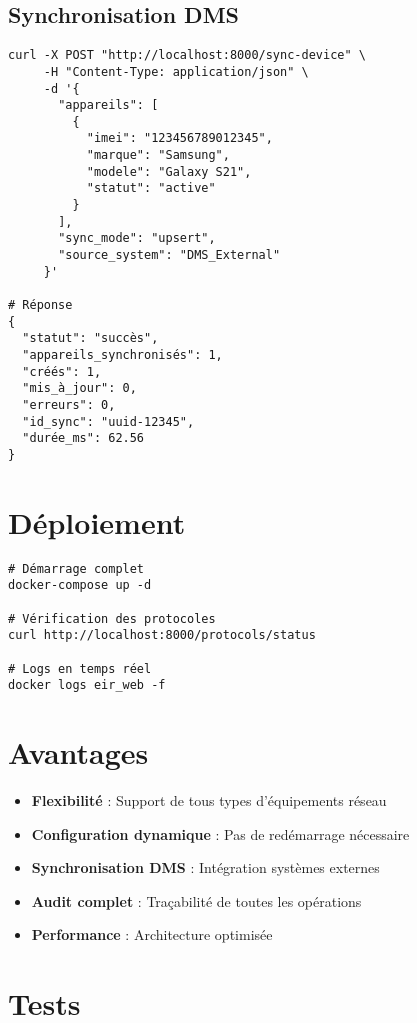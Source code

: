 \documentclass[11pt]{article}
\begin{document}
\subsection{Synchronisation DMS}
\begin{lstlisting}[caption=Synchronisation d'appareils]
curl -X POST "http://localhost:8000/sync-device" \
     -H "Content-Type: application/json" \
     -d '{
       "appareils": [
         {
           "imei": "123456789012345",
           "marque": "Samsung",
           "modele": "Galaxy S21",
           "statut": "active"
         }
       ],
       "sync_mode": "upsert",
       "source_system": "DMS_External"
     }'

# Réponse
{
  "statut": "succès",
  "appareils_synchronisés": 1,
  "créés": 1,
  "mis_à_jour": 0,
  "erreurs": 0,
  "id_sync": "uuid-12345",
  "durée_ms": 62.56
}
\end{lstlisting}

\section{Déploiement}

\begin{lstlisting}[caption=Docker Compose]
# Démarrage complet
docker-compose up -d

# Vérification des protocoles
curl http://localhost:8000/protocols/status

# Logs en temps réel
docker logs eir_web -f
\end{lstlisting}

\section{Avantages}

\begin{itemize}
    \item \textbf{Flexibilité} : Support de tous types d'équipements réseau
    \item \textbf{Configuration dynamique} : Pas de redémarrage nécessaire
    \item \textbf{Synchronisation DMS} : Intégration systèmes externes
    \item \textbf{Audit complet} : Traçabilité de toutes les opérations
    \item \textbf{Performance} : Architecture optimisée
\end{itemize}

\section{Tests}
\end{document}
